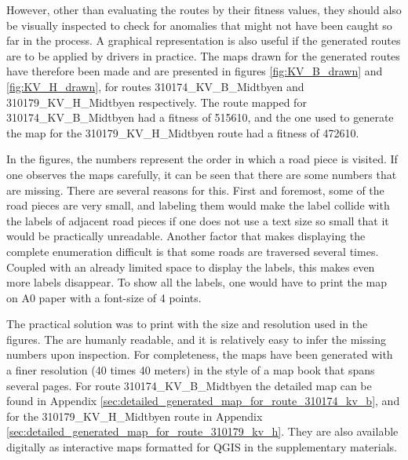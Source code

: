 {
\begin{table}[tbph]
\centering
{} %
\caption{The best result obtained from the MA and the known optimal solution for the BHW1 benchmark.}
\label{tab:trondheim_data_fitness_comparisons}
\end{table}
}

However, other than evaluating the routes by their fitness values, they should also be visually inspected to check for anomalies that might not have been caught so far in the process. A graphical representation is also useful if the generated routes are to be applied by drivers in practice. The maps drawn for the generated routes have therefore been made and are presented in figures \ref{fig:KV_B_drawn} and \ref{fig:KV_H_drawn}, for routes 310174\_KV\_B\_Midtbyen and 310179\_KV\_H\_Midtbyen respectively. The route mapped for 310174\_KV\_B\_Midtbyen had a fitness of 515610, and the one used to generate the map for the 310179\_KV\_H\_Midtbyen route had a fitness of 472610.

In the figures, the numbers represent the order in which a road piece is visited. If one observes the maps carefully, it can be seen that there are some numbers that are missing. There are several reasons for this. First and foremost, some of the road pieces are very small, and labeling them would make the label collide with the labels of adjacent road pieces if one does not use a text size so small that it would be practically unreadable. Another factor that makes displaying the complete enumeration difficult is that some roads are traversed several times. Coupled with an already limited space to display the labels, this makes even more labels disappear. To show all the labels, one would have to print the map on A0 paper with a font-size of 4 points.

The practical solution was to print with the size and resolution used in the figures. The are humanly readable, and it is relatively easy to infer the missing numbers upon inspection. For completeness, the maps have been generated with a finer resolution (40 times 40 meters) in the style of a map book that spans several pages. For route 310174\_KV\_B\_Midtbyen the detailed map can be found in Appendix \ref{sec:detailed_generated_map_for_route_310174_kv_b}, and for the 310179\_KV\_H\_Midtbyen route in Appendix \ref{sec:detailed_generated_map_for_route_310179_kv_h}. They are also available digitally as interactive maps formatted for QGIS in the supplementary materials.

